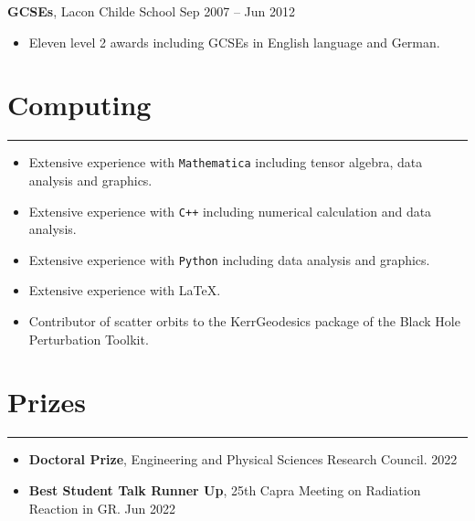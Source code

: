 \documentclass[10.5pt, oneside]{article}   	%
\begin{document}
\textbf{GCSEs}, Lacon Childe School \hfill Sep 2007 -- Jun 2012\\
\vspace{-5mm}
\begin{itemize}
\item Eleven level 2 awards including GCSEs in English language and German.
\end{itemize} 

 {\color{Sectioncolour}
\section*{Computing}
\vspace{-3mm}
\noindent\rule{\linewidth}{0.6pt}}
 \begin{itemize}
\item Extensive experience with \texttt{Mathematica} including tensor algebra, data analysis and graphics. 
\item Extensive experience with \texttt{C++} including numerical calculation and data analysis.
\item Extensive experience with \texttt{Python} including data analysis and graphics. 
\item Extensive experience with \LaTeX.
\item Contributor of scatter orbits to the KerrGeodesics package of the Black Hole Perturbation Toolkit. \href{http://bhptoolkit.org/}{}
\end{itemize}


{\color{Sectioncolour}
\section*{Prizes}
\vspace{-3mm}
\noindent\rule{\linewidth}{0.6pt}}
\begin{itemize}
\item \textbf{Doctoral Prize}, Engineering and Physical Sciences Research Council. \hfill 2022
\item \textbf{Best Student Talk Runner Up}, 25th Capra Meeting on Radiation Reaction in GR. \hfill Jun 2022 
\end{itemize}
 
\end{document}
